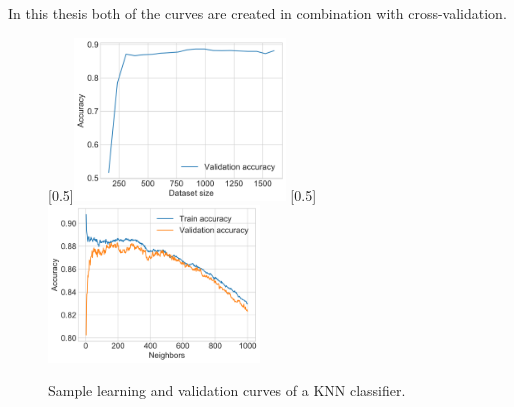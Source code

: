 In this thesis both of the curves are created in combination with cross-validation.
\begin{figure}[h]
    [0.5\linewidth]{\includegraphics[width=0.5\textwidth]{figures/knn_sample_learning_curve.png}}
    [0.5\linewidth]{\includegraphics[width=0.5\textwidth]{figures/knn_sample_validation_curve.png}}
    \caption{Sample learning and validation curves of a \ac{KNN} classifier.}
    \label{figure:sample_learning_validation_curves}
\end{figure}


